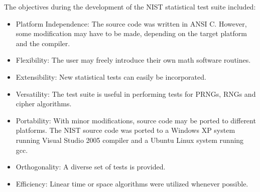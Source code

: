 \documentclass{llncs}
\theoremstyle{plane}
\begin{document}
The objectives during the development of the NIST statistical test suite included:

\begin{itemize}

\item	 Platform Independence: The source code was written in ANSI C. However, some modification
may have to be made, depending on the target platform and the compiler.
\item		 Flexibility: The user may freely introduce their own math software routines.
\item		 Extensibility: New statistical tests can easily be incorporated.
\item		 Versatility: The test suite is useful in performing tests for PRNGs, RNGs and cipher algorithms.
\item	 Portability: With minor modifications, source code may be ported to different platforms. The
NIST source code was ported to a Windows XP system running Visual Studio 2005 compiler and
a Ubuntu Linux system running gcc.
\item	 Orthogonality: A diverse set of tests is provided.
\item	 Efficiency: Linear time or space algorithms were utilized whenever possible.
\end{itemize}
\end{document}
